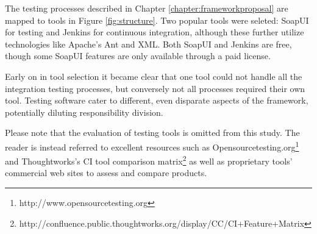 \documentclass[12pt,a4paper,oneside,pdftex]{report}
\begin{document}
{{The testing processes described in Chapter \ref{chapter:frameworkproposal} are mapped to tools in Figure \ref{fig:structure}. Two popular tools were seleted: SoapUI for testing and Jenkins for continuous integration, although these further utilize technologies like Apache's Ant and XML. Both SoapUI and Jenkins are free, though some SoapUI features are only available through a paid license.

Early on in tool selection it became clear that one tool could not handle all the integration testing processes, but conversely not all processes required their own tool. Testing software cater to different, even disparate aspects of the framework, potentially diluting responsibility division.

Please note that the evaluation of testing tools is omitted from this study. The reader is instead referred to excellent resources such as Opensourcetesting.org\footnote{http://www.opensourcetesting.org} and Thoughtworks's CI tool comparison matrix\footnote{http://confluence.public.thoughtworks.org/display/CC/CI+Feature+Matrix} as well as proprietary tools' commercial web sites to assess and compare products.

\begin{figure}[H]
\centering
\end{figure}}}
\end{document}

